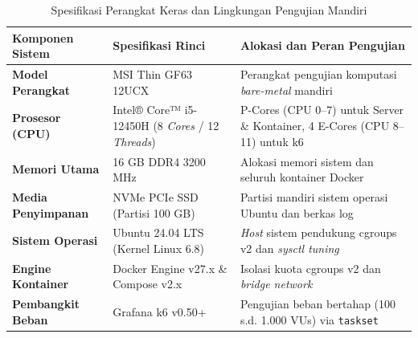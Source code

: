 \begin{table}[H]
    \centering
    \caption{Spesifikasi Perangkat Keras dan Lingkungan Pengujian Mandiri}
    \label{tab:spesifikasi_lingkungan_uji}
    \small
    \begin{tabularx}{\textwidth}{|p{3.2cm}|p{4.6cm}|>{\raggedright\arraybackslash}X|}
        \hline
        \rowcolor[gray]{0.85}
        \textbf{Komponen Sistem} & \textbf{Spesifikasi Rinci} & \textbf{Alokasi dan Peran Pengujian} \\
        \hline
        \textbf{Model Perangkat} & MSI Thin GF63 12UCX & Perangkat pengujian komputasi \textit{bare-metal} mandiri \\
        \hline
        \textbf{Prosesor (CPU)} & Intel® Core™ i5-12450H (8 \textit{Cores} / 12 \textit{Threads}) & 4 P-Cores (CPU 0--7) untuk Server \& Kontainer, 4 E-Cores (CPU 8--11) untuk k6 \\
        \hline
        \textbf{Memori Utama} & 16 GB DDR4 3200 MHz & Alokasi memori sistem dan seluruh kontainer Docker \\
        \hline
        \textbf{Media Penyimpanan} & NVMe PCIe SSD (Partisi 100 GB) & Partisi mandiri sistem operasi Ubuntu dan berkas log \\
        \hline
        \textbf{Sistem Operasi} & Ubuntu 24.04 LTS (Kernel Linux 6.8) & \textit{Host} sistem pendukung cgroups v2 dan \textit{sysctl tuning} \\
        \hline
        \textbf{Engine Kontainer} & Docker Engine v27.x \& Compose v2.x & Isolasi kuota cgroups v2 dan \textit{bridge network} \\
        \hline
        \textbf{Pembangkit Beban} & Grafana k6 v0.50+ & Pengujian beban bertahap (100 s.d. 1.000 VUs) via \texttt{taskset} \\
        \hline
    \end{tabularx}
\end{table}

